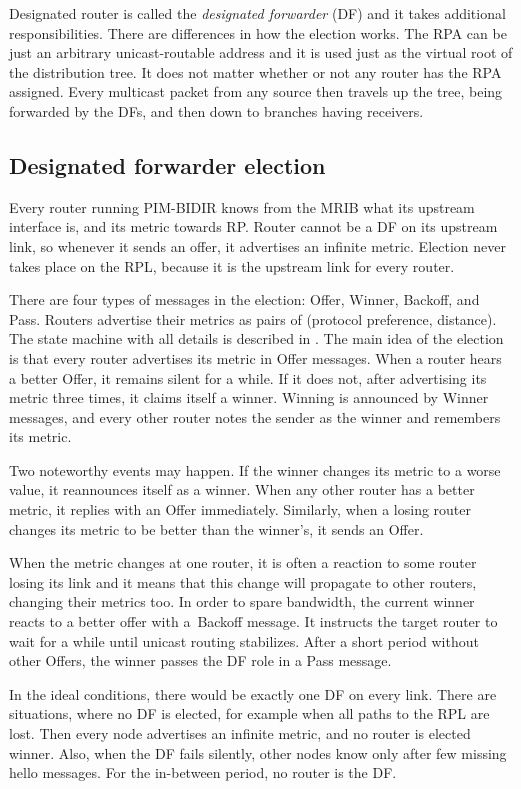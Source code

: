 Designated router is called the \emph{designated forwarder} (DF) and it takes additional
responsibilities. There are differences in how the election works. The RPA can be
just an arbitrary unicast-routable address and it is used just as the virtual root of the
distribution tree. It does not matter whether or not any router has the RPA
assigned. Every multicast packet from any source then travels up the tree,
being forwarded by the DFs, and then down to branches having receivers.

\subsection{Designated forwarder election}

Every router running PIM-BIDIR knows from the MRIB what its upstream interface is,
and its metric towards RP. Router cannot be a DF on its upstream link, so
whenever it sends an offer, it advertises an infinite metric. Election never takes place
on the RPL, because it is the upstream link for every router.

There are four types of messages in the election: Offer, Winner, Backoff, and
Pass. Routers advertise their metrics as pairs of (protocol preference, distance).
The state machine with all details is described in . The main idea of the
election is that every router advertises its metric in Offer messages. When
a router hears a better Offer, it remains silent for a while. If it does not, after
advertising its metric three times, it claims itself a winner. Winning is
announced by Winner messages, and every other router notes the sender as the
winner and remembers its metric.

Two noteworthy events may happen. If the winner changes its metric to a worse value,
it reannounces itself as a winner. When any other router has a better metric,
it replies with an Offer immediately. Similarly, when a losing router changes its
metric to be better than the winner's, it sends an Offer.

When the metric changes at one router, it is often a reaction to some router losing its
link and it means that this change will propagate to other routers, changing their
metrics too. In order to spare bandwidth, the current winner reacts to a better offer
with a~Backoff message. It instructs the target router to wait for a while until
unicast routing stabilizes. After a short period without other Offers, the winner
passes the DF role in a Pass message.

In the ideal conditions, there would be exactly one DF on every link. There are
situations, where no DF is elected, for example when all paths to the RPL are
lost. Then every node advertises an infinite metric, and no router is elected
winner. Also, when the DF fails silently, other nodes know only after few
missing hello messages. For the in-between period, no router is the DF.

